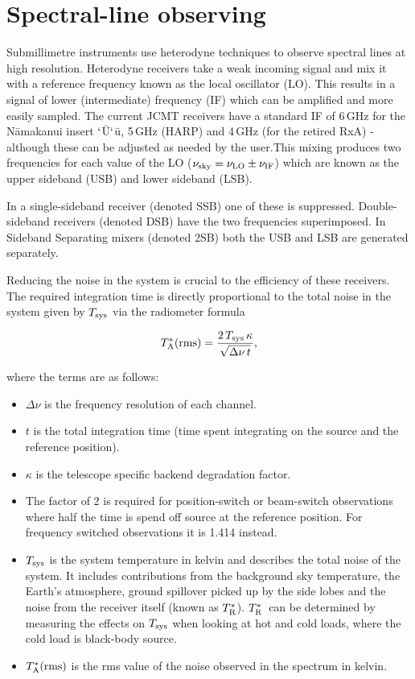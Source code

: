 \documentclass[11pt,oneside,chapters]{starlink}
\newcommand{\trs}{$T_{\textnormal{R}}^{*}$}
\begin{document}
\section{Spectral-line observing}

Submillimetre instruments use heterodyne techniques to observe
spectral lines at high resolution. Heterodyne receivers take a weak
incoming signal and mix it with a reference frequency known as the
local oscillator (LO). This results in a signal of lower
(intermediate) frequency (IF) which can be amplified and more easily
sampled. The current JCMT receivers have a standard IF of 6\,GHz for
the  N\=amakanui insert $`$\=U$`$\=u, 5\,GHz (HARP) and 4\,GHz
(for the retired RxA) - although these can be adjusted as needed by
the user.This mixing produces two frequencies for each value of
the LO ($\nu_{\textnormal{sky}} = \nu_{\textnormal{LO}}\pm\nu_{\textnormal{IF}}$) which are known as the
upper sideband (USB) and lower sideband (LSB).

In a single-sideband receiver (denoted SSB) one of these is suppressed.
Double-sideband receivers (denoted DSB) have the two frequencies
superimposed. In Sideband Separating mixers (denoted 2SB) both the
USB and LSB are generated separately.

Reducing the noise in the system is crucial to the efficiency of these
receivers. The required integration time is directly proportional to
the total noise in the system given by $T_{\textnormal{sys}}$ via the radiometer
formula

\[T_{\textnormal{A}}^*({\textnormal{rms}}) =
\frac{2\,T_{\textnormal{sys}}\,\kappa}{\sqrt{\Delta\nu\,t}},\]

where the terms are as follows:
\begin{itemize}
\item $\Delta\nu$ is the frequency resolution of each channel.

\item $t$ is the total integration time (time spent integrating on the
source and the reference position).

\item $\kappa$ is the telescope specific backend degradation factor.

\item The factor of 2 is required for position-switch or beam-switch
observations where half the time is spend off source at the reference
position. For frequency switched observations it is 1.414 instead.

\item $T_{\textnormal{sys}}$ is the system temperature in kelvin and
describes the total noise of the system. It includes contributions
from the background sky temperature, the Earth's atmosphere, ground
spillover picked up by the side lobes and the noise from the receiver
itself (known as \trs).  \trs\ can
be determined by measuring the effects on $T_{\textnormal{sys}}$ when
looking at hot and cold loads, where the cold load is black-body
source.

\item $T^*_{\textnormal{A}}({\textnormal{rms}})$ is the rms value of the noise observed
in the spectrum in kelvin.
\end{itemize}
\end{document}
